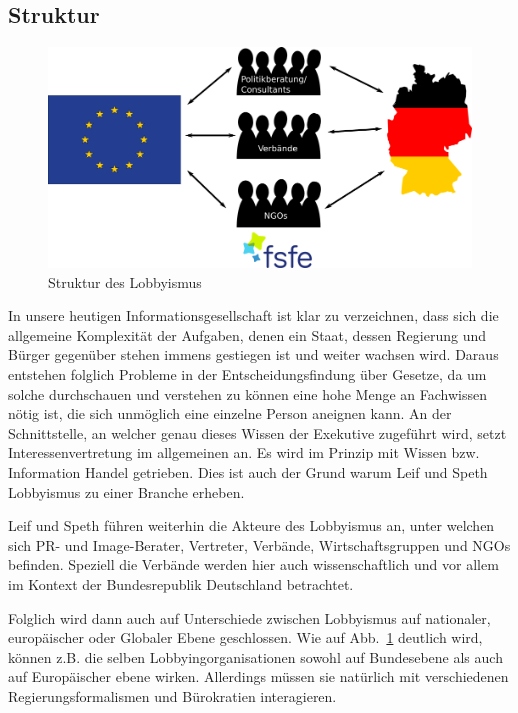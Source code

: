 \subsection{Struktur}
\begin{figure}[h]
	\includegraphics[width=\textwidth]{struktur}
	\centering
	\caption{Struktur des Lobbyismus}
	\label{fig:structure_image}
\end{figure}
In unsere heutigen Informationsgesellschaft ist klar zu verzeichnen, dass sich
die allgemeine Komplexität der Aufgaben, denen ein Staat, dessen Regierung und 
Bürger gegenüber stehen immens gestiegen ist und weiter wachsen wird.
Daraus entstehen folglich Probleme in der Entscheidungsfindung über Gesetze, da 
um solche durchschauen und verstehen zu können eine hohe Menge an Fachwissen 
nötig ist, die sich unmöglich eine einzelne Person aneignen kann. An der 
Schnittstelle, an welcher genau dieses Wissen der Exekutive zugeführt wird, 
setzt Interessenvertretung im allgemeinen an. Es wird im Prinzip mit Wissen 
bzw. Information Handel getrieben. Dies ist auch der Grund warum Leif und 
Speth\cite{LeifSpeth200312} Lobbyismus zu einer Branche erheben.

Leif und Speth führen weiterhin die Akteure des Lobbyismus an, unter 
welchen sich PR- und Image-Berater, Vertreter, Verbände, Wirtschaftsgruppen und 
NGOs befinden. Speziell die Verbände werden hier auch wissenschaftlich 
und vor allem im Kontext der Bundesrepublik Deutschland betrachtet.

Folglich wird dann auch auf Unterschiede zwischen Lobbyismus auf nationaler, 
europäischer oder Globaler Ebene geschlossen. Wie auf 
Abb.~\ref{fig:structure_image} 
deutlich wird, können z.B. die selben Lobbyingorganisationen sowohl auf 
Bundesebene als auch auf Europäischer ebene wirken. Allerdings müssen sie 
natürlich mit verschiedenen Regierungsformalismen und Bürokratien interagieren.




